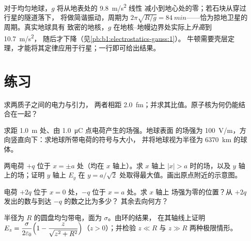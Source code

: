 \begin{example}[地球内部]\label{ex:b1:electrostatics-gauss:earth}
对于均匀地球，$g$ 将从地表处的 \qty{9.8}{m/s^2} 线性
减小到地心处的零；若石块从穿过行星的隧道落下，
将做简谐振动，周期为 $2\pi\sqrt{R/g} =
\qty{84}{min}$——恰为掠地卫星的周期。真实地球具有
致密的地核，$g$ 在地核–地幔边界处实际上\emph{升高}到 \qty{10.7}{m/s^2}，
随后才下降（见\cref{pb:b1:electrostatics-gauss:1}）。
牛顿需要壳层定理，才能将其定律应用于行星；一行即可给出结果。
\end{example}

\section{练习}

\begin{exercise}[$\star$]\label{exo:b1:electrostatics-gauss:1}
求两质子之间的电力与引力，
两者相距 \qty{2.0}{fm}；并求其比值。原子核为何仍能结合在一起？
\end{exercise}

\begin{exercise}[$\star$]\label{exo:b1:electrostatics-gauss:2}
求距 \qty{1.0}{m} 处、由 \qty{1.0}{\micro C} 点电荷产生的场强。地球表面
的场强为 \qty{100}{V/m}，方向竖直向下：求地球所带电荷的符号与大小，
并将地球视为半径为 \qty{6370}{km} 的球体。
\end{exercise}

\begin{exercise}[$\star$]\label{exo:b1:electrostatics-gauss:3}
两电荷 $+q$ 位于 $x = \pm a$ 处（均在 $x$ 轴上）。求 $x$ 轴上
$|x| > a$ 时的场，以及 $y$ 轴上的场；证明 $y$ 轴上 $E_y$
在 $y = a/\sqrt2$ 处取得最大值。画出原点附近的示意图。
\end{exercise}

\begin{exercise}[$\star$]\label{exo:b1:electrostatics-gauss:4}
电荷 $+2q$ 位于 $x = 0$ 处，$-q$ 位于 $x = a$ 处。求 $x$ 轴上
场强为零的位置？从 $+2q$ 发出的数与到达 $-q$ 的数之比为多少？
其余去向何方？
\end{exercise}

\begin{exercise}[$\star\star$]\label{exo:b1:electrostatics-gauss:5}
半径为 $R$ 的圆盘均匀带电，面为 $\sigma$。由环的结果，
在其轴线上证明 $E_z = \dfrac{\sigma}{2\varepsilon_0}\Bigl(1 - \dfrac{z}{\sqrt{z^2 +
R^2}}\Bigr)$（$z > 0$）；并检验 $z \ll R$ 与 $z \gg R$ 两种极限情形。
\end{exercise}

